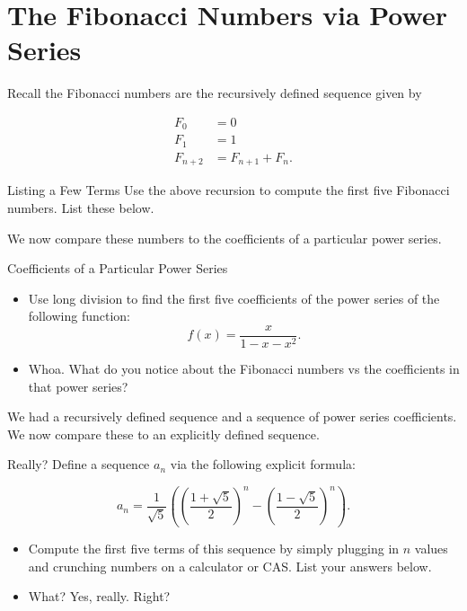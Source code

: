 \section{The Fibonacci Numbers via Power Series}\label{FigAndGnocchiNumbers}

Recall the Fibonacci numbers are the recursively defined sequence given by

\begin{align*}
 F_0&=0 \\ 
F_1&=1 \\ 
F_{n+2}&=F_{n+1}+F_n.
\end{align*}

\begin{exercise}{Listing a Few Terms \Coffeecup}
Use the above recursion to compute the first five Fibonacci numbers.  List these below.
\vspace*{.5in}
\end{exercise}

We now compare these numbers to the coefficients of a particular power series.

\begin{exercise}{Coefficients of a Particular Power Series \Coffeecup \Coffeecup \Coffeecup}
\begin{itemize}
\item Use long division to find the first five coefficients of the power series of the following function:
$$ f(x) = \frac{x}{1-x-x^2}. $$
\vspace*{2in}
\item Whoa.  What do you notice about the Fibonacci numbers vs the coefficients in that power series?
\vspace*{.5in}
\end{itemize}
\end{exercise}

We had a recursively defined sequence and a sequence of power series coefficients.  We now compare these to an explicitly defined sequence.
\begin{exercise}{Really? \Coffeecup \Coffeecup}
Define a sequence $a_n$ via the following explicit formula:

$$a_n = \frac{1}{\sqrt{5}} \left( \left(\frac{1+\sqrt{5}}{2}\right)^n-\left(\frac{1-\sqrt{5}}{2}\right)^n \right).   $$
\begin{itemize}
\item Compute the first five terms of this sequence by simply plugging in $n$ values and crunching numbers on a calculator or CAS.  List your answers below.
\vspace*{1in}
\item What?  Yes, really.  Right?
\vspace*{.5in}
\end{itemize}
\end{exercise}

